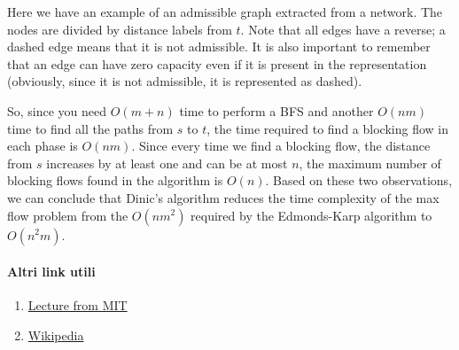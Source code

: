 \begin{center}

\end{center}
Here we have an example of an admissible graph extracted from a network.
The nodes are divided by distance labels from $t$.
Note that all edges have a reverse; a dashed edge means that it is not admissible. It is also important to remember that an edge can have zero capacity even if it is present in the representation (obviously, since it is not admissible, it is represented as dashed).

So, since you need $O(m + n)$ time to perform a BFS and another $O(nm)$ time to find all the paths from $s$ to $t$, the time required to find a blocking flow in each phase is $O(nm)$.
Since every time we find a blocking flow, the distance from $s$ increases by at least one and can be at most $n$, the maximum number of blocking flows found in the algorithm is $O(n)$.
Based on these two observations, we can conclude that Dinic's algorithm reduces the time complexity of the max flow problem from the $O(nm^2)$ required by the Edmonds-Karp algorithm to $O(n^2m)$.

\paragraph{Altri link utili}\begin{enumerate}
    \item \href{http://courses.csail.mit.edu/6.854/16/Notes/n10-blocking_flows.html}{Lecture from MIT}
    \item \href{https://en.wikipedia.org/wiki/Dinic%27s_algorithm}{Wikipedia}
\end{enumerate}

\cleardoublepage

